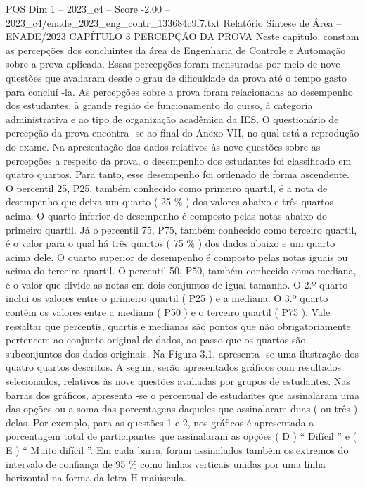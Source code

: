 \begin{textsample}{POS Dim 1 – 2023\_c4 – Score -2.00 – 2023\_c4/enade\_2023\_eng\_contr\_133684c9f7.txt}  \label{ex:f1_pos_192}
Relatório Síntese de Área – ENADE/2023 CAPÍTULO 3 PERCEPÇÃO DA PROVA Neste capítulo, constam as percepções dos concluintes da área de Engenharia de Controle e Automação sobre a prova aplicada.
Essas percepções foram mensuradas por meio de nove questões que avaliaram desde o grau de dificuldade da prova até o tempo gasto para concluí -la.
As percepções sobre a prova foram relacionadas ao desempenho dos estudantes, à grande região de funcionamento do curso, à categoria administrativa e ao tipo de organização acadêmica da IES.
O questionário de percepção da prova encontra -se ao final do Anexo VII, no qual está a reprodução do exame.
Na apresentação dos dados relativos às nove questões sobre as percepções a respeito da prova, o desempenho dos estudantes foi classificado em quatro quartos.
Para tanto, esse desempenho foi ordenado de forma ascendente.
O percentil 25, P25, também conhecido como primeiro quartil, é a nota de desempenho que deixa um quarto ( 25 \% ) dos valores abaixo e três quartos acima.
O quarto inferior de desempenho é composto pelas notas abaixo do primeiro quartil.
Já o percentil 75, P75, também conhecido como terceiro quartil, é o valor para o qual há três quartos ( 75 \% ) dos dados abaixo e um quarto acima dele.
O quarto superior de desempenho é composto pelas notas iguais ou acima do terceiro quartil.
O percentil 50, P50, também conhecido como mediana, é o valor que divide as notas em dois conjuntos de igual tamanho.
O 2.º quarto inclui os valores entre o primeiro quartil ( P25 ) e a mediana.
O 3.º quarto contém os valores entre a mediana ( P50 ) e o terceiro quartil ( P75 ).
Vale ressaltar que percentis, quartis e medianas são pontos que não obrigatoriamente pertencem ao conjunto original de dados, ao passo que os quartos são subconjuntos dos dados originais.
Na Figura 3.1, apresenta -se uma ilustração dos quatro quartos descritos.
A seguir, serão apresentados gráficos com resultados selecionados, relativos às nove questões avaliadas por grupos de estudantes.
Nas barras dos gráficos, apresenta -se o percentual de estudantes que assinalaram uma das opções ou a soma das porcentagens daqueles que assinalaram duas ( ou três ) delas.
Por exemplo, para as questões 1 e 2, nos gráficos é apresentada a porcentagem total de participantes que assinalaram as opções ( D ) “ Difícil ” e ( E ) “ Muito difícil ”.
Em cada barra, foram assinalados também os extremos do intervalo de confiança de 95 \% como linhas verticais unidas por uma linha horizontal na forma da letra H maiúscula.

\end{textsample}
